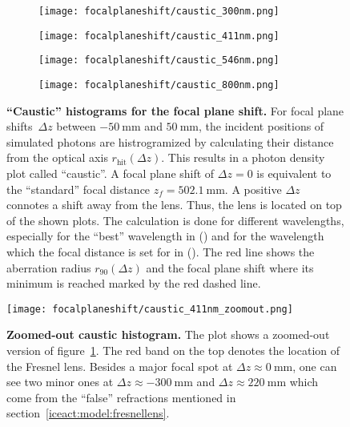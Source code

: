 \begin{figure}[H]
	\centering
	\begin{subfigure}[t]{0.48\textwidth}
		\centering
		\texttt{[image: focalplaneshift/caustic\_300nm.png]}
	\end{subfigure}
	\hfill
	\begin{subfigure}[t]{0.48\textwidth}
		\centering
		\texttt{[image: focalplaneshift/caustic\_411nm.png]}
		\label{focalplaneshift_bestwvl}
	\end{subfigure}
	\hfill
	\begin{subfigure}[t]{0.48\textwidth}
		\centering
		\texttt{[image: focalplaneshift/caustic\_546nm.png]}
		\label{focalplaneshift_famouswvl}
	\end{subfigure}
	\hfill
	\begin{subfigure}[t]{0.48\textwidth}
		\centering
		\texttt{[image: focalplaneshift/caustic\_800nm.png]}
	\end{subfigure}
	\caption[\enquote{Caustic} histograms for the focal plane shift]{\textbf{\enquote{Caustic} histograms for the focal plane shift.} For focal plane shifts~$\Delta z$ between $\SI{-50}{\milli\meter}$ and $\SI{50}{\milli\meter}$, the incident positions of simulated photons are histrogramized by calculating their distance from the optical axis $r_\text{hit}(\Delta z)$. This results in a photon density plot called \enquote{caustic}. A focal plane shift of $\Delta z = 0$ is equivalent to the \enquote{standard} focal distance $z_f=\SI{502.1}{\milli\meter}$. A positive $\Delta z$ connotes a shift away from the lens. Thus, the lens is located on top of the shown plots. The calculation is done for different wavelengths, especially for the \enquote{best} wavelength in () and for the wavelength which the focal distance is set for in (). The red line shows the aberration radius $r_{90}(\Delta z)$ and the focal plane shift where its minimum is reached marked by the red dashed line.}
	\label{focalplaneshift}
\end{figure}

\begin{figure}[H]
	\centering
	\texttt{[image: focalplaneshift/caustic\_411nm\_zoomout.png]}
	\caption[Zoomed-out caustic histogram]{\textbf{Zoomed-out caustic histogram.} The plot shows a zoomed-out version of figure~\ref{focalplaneshift_bestwvl}. The red band on the top denotes the location of the Fresnel lens. Besides a major focal spot at $\Delta z\approx\SI{0}{\milli\meter}$, one can see two minor ones at $\Delta z\approx\SI{-300}{\milli\meter}$ and $\Delta z\approx\SI{220}{\milli\meter}$ which come from the \enquote{false} refractions mentioned in section~\ref{iceact:model:fresnellens}.}
	\label{focalplaneshift_zoomout}
\end{figure}

